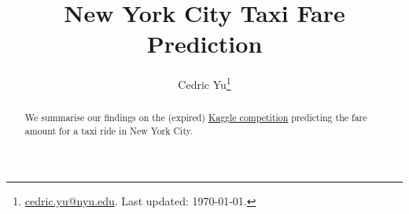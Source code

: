 \documentclass[12pt,letterpaper,final]{article}
\numberwithin{equation}{section}
\begin{document}
\renewcommand{\Im}{{\rm Im}\,}
\renewcommand{\Re}{{\rm Re}\,}
\newcommand{\diag}{{\rm diag} \, }
\newcommand{\Tr}{{\rm Tr}\,}
\newcommand{\tr}{{\rm tr}\,}
\newcommand{\C}{{\mathcal{C}}}

\title{\vspace{-2.5cm}\color{PineGreen}\textbf{New York City Taxi Fare Prediction}}
\date{} %
\author{Cedric Yu\footnote{\href{mailto:cedric.yu@nyu.edu}{cedric.yu@nyu.edu}. Last updated: \today.}}
\maketitle
\vspace{-1cm}
\begin{abstract}
We summarise our findings on the (expired) \href{https://www.kaggle.com/c/new-york-city-taxi-fare-prediction/overview}{Kaggle competition} predicting the fare amount for a taxi ride in New York City.
\end{abstract}






\end{document}
